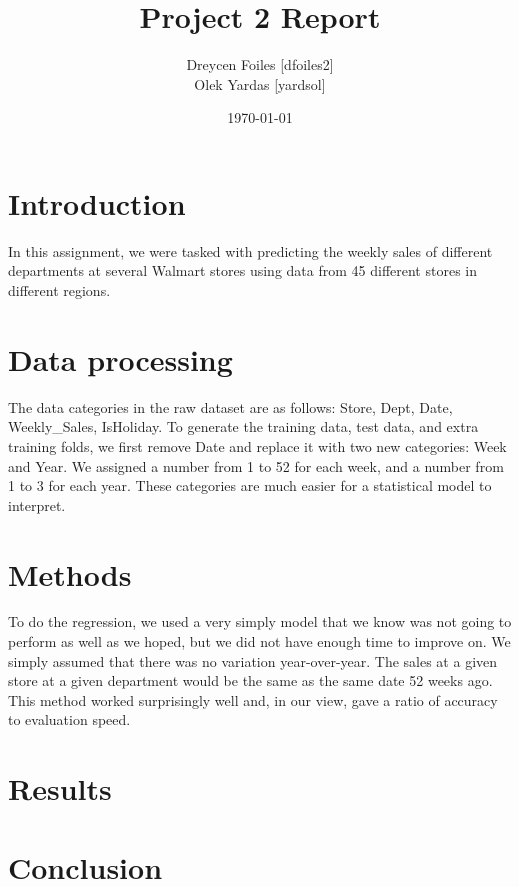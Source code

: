 \documentclass{article}
\title{Project 2 Report}
\author{Dreycen Foiles [dfoiles2] \\ Olek Yardas [yardsol]}
\date{\today}
\begin{document}
\maketitle

\section{Introduction}
In this assignment, we were tasked with predicting the weekly sales of
different departments at several Walmart stores using data from 45 different
stores in different regions.

\section{Data processing}
The data categories in the raw dataset are as follows: Store, Dept, Date,
Weekly\_Sales, IsHoliday. To generate the training data, test data, and extra
training folds, we first remove Date and replace it with two new categories:
Week and Year. We assigned a number from 1 to 52 for each week, and a number
from 1 to 3 for each year. These categories are much easier for a statistical model to interpret.

\section{Methods}
To do the regression, we used a very simply model that we know was not going to perform as well as we hoped, but we did not have enough time to improve on. We simply assumed that there was no variation year-over-year. The sales at a given store at a given department would be the same as the same date 52 weeks ago. This method worked surprisingly well and, in our view, gave a ratio of accuracy to evaluation speed. 

\section{Results}

\section{Conclusion}
\end{document}

